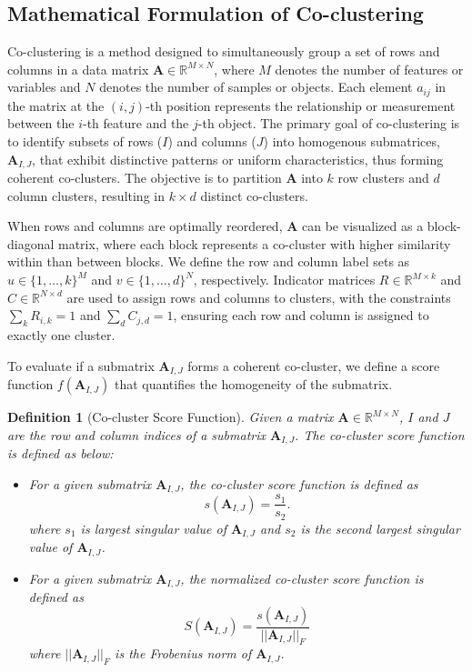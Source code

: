\documentclass[journal]{IEEEtran}
\newtheorem{definition}{Definition}
\begin{document}
\subsection{Mathematical Formulation of Co-clustering}
Co-clustering is a method designed to simultaneously group a set of rows and columns in a data matrix $\mathbf{A} \in \mathbb{R}^{M \times N}$, where $M$ denotes the number of features or variables and $N$ denotes the number of samples or objects. Each element $a_{ij}$ in the matrix at the $(i, j)$-th position represents the relationship or measurement between the $i$-th feature and the $j$-th object. The primary goal of co-clustering is to identify subsets of rows ($I$) and columns ($J$) into homogenous submatrices, $\mathbf{A}_{I, J}$, that exhibit distinctive patterns or uniform characteristics, thus forming coherent co-clusters. The objective is to partition $\mathbf{A}$ into $k$ row clusters and $d$ column clusters, resulting in $k \times d$ distinct co-clusters.

When rows and columns are optimally reordered, $\mathbf{A}$ can be visualized as a block-diagonal matrix, where each block represents a co-cluster with higher similarity within than between blocks. We define the row and column label sets as \( u \in \{1,\dots,k\}^M \) and \( v \in \{1,\dots,d\}^N \), respectively. Indicator matrices \( R \in \mathbb{R}^{M \times k} \) and \( C \in \mathbb{R}^{N \times d} \) are used to assign rows and columns to clusters, with the constraints \( \sum_k R_{i,k} = 1 \) and \( \sum_d C_{j,d} = 1 \), ensuring each row and column is assigned to exactly one cluster.

To evaluate if a submatrix $\mathbf{A}_{I, J}$ forms a coherent co-cluster, we define a score function \( f(\mathbf{A}_{I, J}) \) that quantifies the homogeneity of the submatrix.

\begin{definition}[Co-cluster Score Function]
  \label{def:co_cluster}
  Given a matrix $\mathbf{A} \in \mathbb{R}^{M \times N}$, $I$ and $J$ are the row and column indices of a submatrix $\mathbf{A}_{I, J}$. The co-cluster score function is defined as below:
  \begin{itemize}
    \item For a given submatrix $\mathbf{A}_{I, J}$, the co-cluster score function is defined as 
    $$s(\mathbf{A}_{I, J}) = \frac{s_1}{s_2}. $$ where $s_1$ is largest singular value of $\mathbf{A}_{I, J}$ and $s_2$ is the second largest singular value of $\mathbf{A}_{I, J}$.
    \item For a given submatrix $\mathbf{A}_{I, J}$, the normalized co-cluster score function is defined as
    $$S(\mathbf{A}_{I, J}) = \frac{s(\mathbf{A}_{I, J})}{||\mathbf{A}_{I, J}||_F} $$ where $||\mathbf{A}_{I, J}||_F$ is the Frobenius norm of $\mathbf{A}_{I, J}$.
  \end{itemize}
\end{definition}
\end{document}
